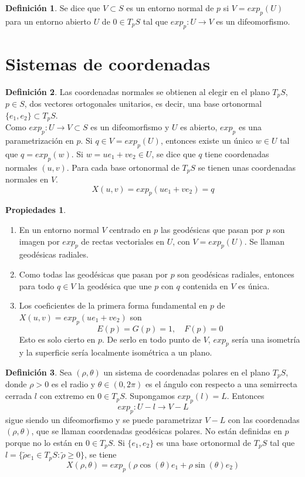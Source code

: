 \documentclass{report}
\theoremstyle{remark}
\theoremstyle{remark}
\theoremstyle{definition}
\newtheorem{definition}{Definición}[chapter]
\theoremstyle{definition}
\newtheorem*{properties}{Propiedades}
\theoremstyle{definition}
\begin{document}
\begin{definition}
    Se dice que $V \subset S$ es un entorno normal de $p$ si $V = exp_p(U)$ para un entorno abierto $U$ de $0 \in T_pS$ tal que $exp_p : U \to V$ es un difeomorfismo.
\end{definition}

\section{Sistemas de coordenadas}

\begin{definition}
    Las coordenadas normales se obtienen al elegir en el plano $T_pS$, $p \in S$, dos vectores ortogonales unitarios, es decir, una base ortonormal $\{e_1, e_2\} \subset T_pS$.\\
    Como $exp_p : U \to V \subset S$ es un difeomorfismo y $U$ es abierto, $exp_p$ es una parametrización en $p$.
    Si $q \in V = exp_p(U)$, entonces existe un único $w \in U$ tal que $q = exp_p(w)$.
    Si $w = ue_1 + ve_2 \in U$, se dice que $q$ tiene coordenadas normales $(u, v)$.
    Para cada base ortonormal de $T_pS$ se tienen unas coordenadas normales en $V$.
    $$X(u, v) = exp_p(ue_1 + ve_2) = q$$
\end{definition}

\begin{properties}
    \hfill
    \begin{enumerate}
        \item En un entorno normal $V$ centrado en $p$ las geodésicas que pasan por $p$ son imagen por $exp_p$ de rectas vectoriales en $U$, con $V = exp_p(U)$. Se llaman geodésicas radiales.
        \item Como todas las geodésicas que pasan por $p$ son geodésicas radiales, entonces para todo $q \in V$ la geodésica que une $p$ con $q$ contenida en $V$ es única.
        \item Los coeficientes de la primera forma fundamental en $p$ de $X(u, v) = exp_p(ue_1 + ve_2)$ son $$E(p) = G(p) = 1, \quad F(p) = 0$$
              Esto es solo cierto en $p$. De serlo en todo punto de $V$, $exp_p$ sería una isometría y la superficie sería localmente isométrica a un plano.
    \end{enumerate}
\end{properties}

\begin{definition}
    Sea $(\rho, \theta)$ un sistema de coordenadas polares en el plano $T_pS$, donde $\rho>0$ es el radio y $\theta \in (0, 2\pi)$ es el ángulo con respecto a una semirrecta cerrada $l$ con extremo en $0 \in T_pS$.
    Supongamos $exp_p(l) = L$. Entonces $$exp_p : U-l \to V-L$$ sigue siendo un difeomorfismo y se puede parametrizar $V-L$ con las coordenadas $(\rho, \theta)$, que se llaman coordenadas geodésicas polares.
    No están definidas en $p$ porque no lo están en $0 \in T_pS$.
    Si $\{e_1, e_2\}$ es una base ortonormal de $T_pS$ tal que $l = \{ \tilde{\rho}e_1 \in T_pS : \tilde{\rho} \geq 0 \}$, se tiene $$X(\rho, \theta) = exp_p(\rho \cos(\theta)e_1 + \rho \sin(\theta)e_2)$$
\end{definition}
\end{document}
